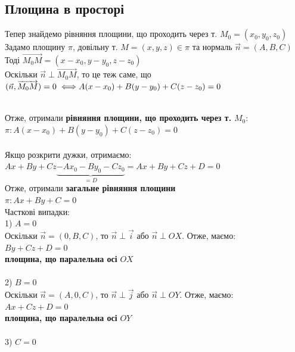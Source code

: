 \documentclass[a4paper, 14pt]{extarticle}
\def\bigline{\vspace{5mm}\\}
\begin{document}
\subsection{Площина в просторі}
Тепер знайдемо рівняння площини, що проходить через т. $M_0 = (x_0,y_0,z_0)$\\
Задамо площину $\pi$, довільну т. $M = (x,y,z) \in \pi$ та нормаль $\vec{n} = (A,B,C)$\\
Тоді $\overrightarrow{M_0M} = (x-x_0, y-y_0, z-z_0)$\\
Оскільки $\vec{n} \perp \overrightarrow{M_0 M}$, то це теж саме, що $(\vec{n}, \overrightarrow{M_0 M}) = 0 \iff \\ A(x-x_0)+B(y-y_0)+C(z-z_0)=0$\\
\\
Отже, отримали \textbf{рівняння площини, що проходить через т.} $M_0$:\\
$\pi: A(x-x_0) + B(y-y_0) + C(z-z_0) = 0$
\bigline
\\
Якщо розкрити дужки, отримаємо:\\
$Ax + By + Cz \underbrace{-Ax_0 - By_0 - Cz_0}_{= D} = Ax+By+Cz+D = 0$\\
Отже, отримали \textbf{загальне рівняння площини}\\
$\pi: Ax + By + C = 0$
\bigline
Часткові випадки:\\
1) $A = 0$\\
Оскільки $\vec{n} = (0,B,C)$, то $\vec{n} \perp \vec{i}$ або $\vec{n} \perp OX$. Отже, маємо:\\
$By + Cz + D = 0$\\
\textbf{площина, що паралельна осі} $OX$\\
\\
2) $B = 0$\\
Оскільки $\vec{n} = (A,0,C)$, то $\vec{n} \perp \vec{j}$ або $\vec{n} \perp OY$. Отже, маємо:\\
$Ax + Cz + D = 0$\\
\textbf{площина, що паралельна осі} $OY$\\
\\
3) $C = 0$\\
\end{document}
